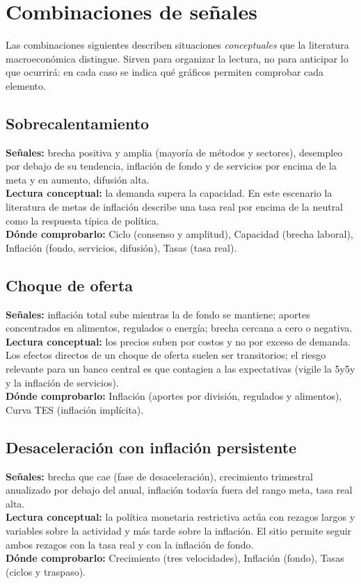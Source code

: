 \chapter{Combinaciones de señales}
\label{es:i:combinaciones}

Las combinaciones siguientes describen situaciones \emph{conceptuales} que la literatura macroeconómica distingue.
Sirven para organizar la lectura, no para anticipar lo que ocurrirá: en cada caso se indica qué gráficos permiten
comprobar cada elemento.

\section{Sobrecalentamiento}
\textbf{Señales:} brecha positiva y amplia (mayoría de métodos y sectores), desempleo por debajo de su tendencia,
inflación de fondo y de servicios por encima de la meta y en aumento, difusión alta.\\
\textbf{Lectura conceptual:} la demanda supera la capacidad. En este escenario la literatura de metas de inflación
describe una tasa real por encima de la neutral como la respuesta típica de política.\\
\textbf{Dónde comprobarlo:} Ciclo (consenso y amplitud), Capacidad (brecha laboral), Inflación (fondo, servicios,
difusión), Tasas (tasa real).

\section{Choque de oferta}
\textbf{Señales:} inflación total sube mientras la de fondo se mantiene; aportes concentrados en alimentos, regulados o
energía; brecha cercana a cero o negativa.\\
\textbf{Lectura conceptual:} los precios suben por costos y no por exceso de demanda. Los efectos directos de un choque
de oferta suelen ser transitorios; el riesgo relevante para un banco central es que contagien a las expectativas
(vigile la 5y5y y la inflación de servicios).\\
\textbf{Dónde comprobarlo:} Inflación (aportes por división, regulados y alimentos), Curva TES (inflación implícita).

\section{Desaceleración con inflación persistente}
\textbf{Señales:} brecha que cae (fase de desaceleración), crecimiento trimestral anualizado por debajo del anual,
inflación todavía fuera del rango meta, tasa real alta.\\
\textbf{Lectura conceptual:} la política monetaria restrictiva actúa con rezagos largos y variables sobre la actividad
y más tarde sobre la inflación. El sitio permite seguir ambos rezagos con la tasa real y con la inflación de fondo.\\
\textbf{Dónde comprobarlo:} Crecimiento (tres velocidades), Inflación (fondo), Tasas (ciclos y traspaso).


